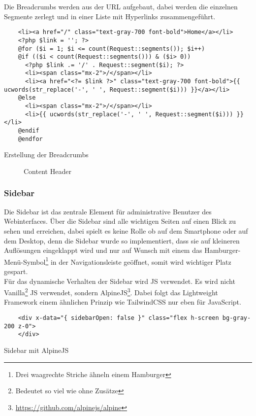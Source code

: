 Die Breadcrumbs werden aus der URL aufgebaut, dabei werden die einzelnen
Segmente zerlegt und in einer Liste mit Hyperlinks zusammengeführt.  

\begin{listing}[H]
  \begin{verbatim}
    <li><a href="/" class="text-gray-700 font-bold">Home</a></li>
    <?php $link = ''; ?>
    @for ($i = 1; $i <= count(Request::segments()); $i++)
    @if (($i < count(Request::segments())) & ($i> 0))
      <?php $link .= '/' . Request::segment($i); ?>
      <li><span class="mx-2">/</span></li>
      <li><a href="<?= $link ?>" class="text-gray-700 font-bold">{{ ucwords(str_replace('-', ' ', Request::segment($i))) }}</a></li>
    @else 
      <li><span class="mx-2">/</span></li>
      <li>{{ ucwords(str_replace('-', ' ', Request::segment($i))) }}</li>
    @endif
    @endfor
  \end{verbatim}
  \caption{Erstellung der Breadcrumbs}
\end{listing}

\begin{figure}[H]
  \centering
  \caption{Content Header}
\end{figure}


\subsubsection{Sidebar}
Die Sidebar ist das zentrale Element für administrative Benutzer des
Webinterfaces. Über die Sidebar sind alle wichtigen Seiten auf einen Blick zu
sehen und erreichen, dabei spielt es keine Rolle ob auf dem Smartphone oder auf
dem Desktop, denn die Sidebar wurde so implementiert, dass sie auf kleineren
Auflösungen eingeklappt wird und nur auf Wunsch mit einem das
Hamburger-Menü-Symbol\footnote{Drei waagrechte Striche ähneln einem Hamburger}
in der Navigationsleiste geöffnet, somit wird wichtiger Platz gespart.\\

Für das dynamische Verhalten der Sidebar wird \acl*{JS} verwendet. Es wird nicht
Vanilla\footnote{Bedeutet so viel wie ohne Zusätze} \acl*{JS} verwendet, sondern
AlpineJS\footnote{\url{https://github.com/alpinejs/alpine}}. Dabei folgt das
Lightweight Framework einem ähnlichen Prinzip wie TailwindCSS nur eben für
JavaScript. 

\begin{listing}[H]
  \begin{verbatim}
    <div x-data="{ sidebarOpen: false }" class="flex h-screen bg-gray-200 z-0">
    </div>
  \end{verbatim}
  \caption{Sidebar mit AlpineJS}
\end{listing}


